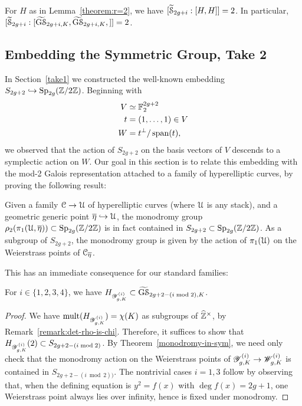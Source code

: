 \begin{corollary} \label{theorem:r=2:special}
For $H$ as in Lemma~\ref{theorem:r=2}, we have $[\hyphat_{2g+i} : [H, H]] = 2$. In particular, $[\hyphat_{2g+i} : [
\widetilde{\mathrm{G} \mathcal {S}}_{2g+i, K}, 
\widetilde{\mathrm{G} \mathcal {S}}_{2g+i, K}, 
]] = 2$. 
\end{corollary} 

\subsection{Embedding the Symmetric Group, Take 2} \label{symbed}

In Section~\ref{take1} we constructed the well-known embedding $S_{2g+2} \hookrightarrow \Sp_{2g}(\bz / 2 \bz)$. Beginning with
\begin{align*}
	V &\simeq \FF_2^{2g+2} \\
	t &= (1, \dots, 1) \in V \\
	W &= t^{\perp}/\on{span}(t),
\end{align*}
we observed that the action of $S_{2g+2}$ on the basis vectors of $V$ descends to a symplectic action on $W$. Our goal in this section is to relate this embedding with the mod-2 Galois representation attached to a family of hyperelliptic curves, by proving the following result:
\begin{theorem} \label{monodromy-in-sym}
	Given a family $\mc{C} \to \mc{U}$ of hyperelliptic curves (where $\mc{U}$ is any stack), and a geometric generic point $\ol{\eta} \hookrightarrow \mc{U}$, the monodromy group $\rho_{2}(\pi_1(\mc{U}, \ol{\eta})) \subset \Sp_{2g}(\bz / 2 \bz)$ is in fact contained in $S_{2g+2} \subset \Sp_{2g}(\bz / 2 \bz)$. As a subgroup of $S_{2g+2}$, the monodromy group is given by the action of $\pi_1(\mc{U})$ on the Weierstrass points of $\mc{C}_{\ol{\eta}}$.
\end{theorem}
This has an immediate consequence for our standard families:
\begin{corollary} \label{sym-W}
	For $i \in \{1, 2, 3, 4\}$, we have $\mono_{\standardFamily g i K} \subset \grouphypboth g {(i \bmod 2)} K$.
\end{corollary}
\begin{proof}
	We have $\on{mult}(\mono_{\standardFamily g i K}) = \chi(K)$ as subgroups of $\zh^\times$, by Remark~\ref{remark:det-rho-is-chi}. Therefore, it suffices to show that $\mono_{\standardFamily g i K}(2) \subset S_{2g+2-(i \bmod 2)}$. By Theorem~\ref{monodromy-in-sym}, we need only check that the monodromy action on the Weierstrass points of $\standardFamily g i K \to \standardTarget g i K$ is contained in $S_{2g+2-(i \bmod 2))}$. The nontrivial cases $i = 1, 3$ follow by observing that, when the defining equation is $y^2 = f(x)$ with $\deg f(x) = 2g+1$, one Weierstrass point always lies over infinity, hence is fixed under monodromy.
\end{proof}

